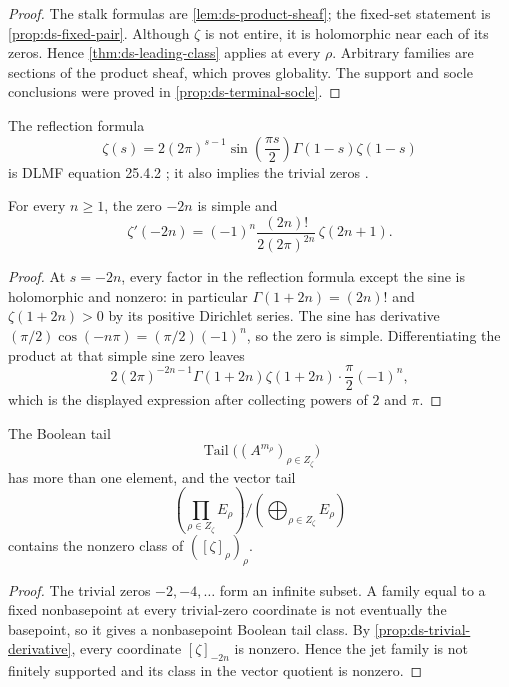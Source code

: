\begin{proof}
The stalk formulas are \cref{lem:ds-product-sheaf}; the fixed-set statement is
\cref{prop:ds-fixed-pair}.  Although $\zeta$ is not entire, it is holomorphic near
each of its zeros.  Hence \cref{thm:ds-leading-class} applies at every $\rho$.
Arbitrary families are sections of the product sheaf, which proves globality.
The support and socle conclusions were proved in
\cref{prop:ds-terminal-socle}.
\end{proof}

The reflection formula
\[
 \zeta(s)=2(2\pi)^{s-1}\sin\!\left(\frac{\pi s}{2}\right)
 \Gamma(1-s)\zeta(1-s)
\]
is DLMF equation 25.4.2 \cite[\S25.4, Eq.~25.4.2]{apostolDLMF25}; it also
implies the trivial zeros \cite[\S25.10(i)]{apostolDLMF25}.

\begin{proposition}
\label{prop:ds-trivial-derivative}
For every $n\geq1$, the zero $-2n$ is simple and
\[
 \zeta'(-2n)
 =(-1)^n\frac{(2n)!}{2(2\pi)^{2n}}\,\zeta(2n+1).
\]
\end{proposition}

\begin{proof}
At $s=-2n$, every factor in the reflection formula except the sine is holomorphic
and nonzero: in particular $\Gamma(1+2n)=(2n)!$ and
$\zeta(1+2n)>0$ by its positive Dirichlet series.  The sine has derivative
$(\pi/2)\cos(-n\pi)=(\pi/2)(-1)^n$, so the zero is simple.  Differentiating the
product at that simple sine zero leaves
\[
 2(2\pi)^{-2n-1}\Gamma(1+2n)\zeta(1+2n)
 \cdot\frac\pi2(-1)^n,
\]
which is the displayed expression after collecting powers of $2$ and $\pi$.
\end{proof}

\begin{corollary}
\label{cor:ds-zeta-tail}
The Boolean tail
\[
 \operatorname{Tail}\bigl((A^{m_\rho})_{\rho\in Z_\zeta}\bigr)
\]
has more than one element, and the vector tail
\[
 \left(\prod_{\rho\in Z_\zeta}E_\rho\right)
 \Big/\left(\bigoplus_{\rho\in Z_\zeta}E_\rho\right)
\]
contains the nonzero class of $([\zeta]_\rho)_\rho$.
\end{corollary}

\begin{proof}
The trivial zeros $-2,-4,\ldots$ form an infinite subset.  A family equal to a
fixed nonbasepoint at every trivial-zero coordinate is not eventually the
basepoint, so it gives a nonbasepoint Boolean tail class.  By
\cref{prop:ds-trivial-derivative}, every coordinate $[\zeta]_{-2n}$ is nonzero.
Hence the jet family is not finitely supported and its class in the vector quotient
is nonzero.
\end{proof}

